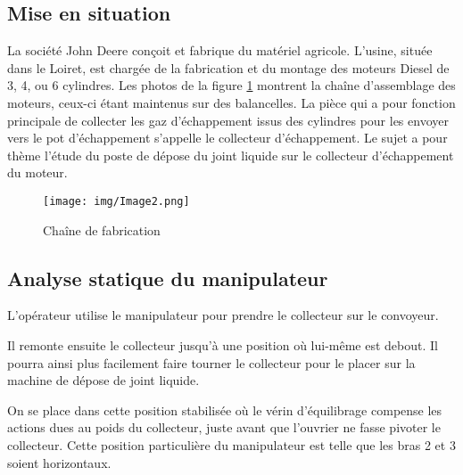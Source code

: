 \subsection{Mise en situation}

La société John Deere conçoit et fabrique du matériel agricole. L'usine, située dans le Loiret, est chargée de la fabrication et du montage des moteurs Diesel de 3, 4, ou 6 cylindres.
Les photos de la figure \ref{fig:image1} montrent la chaîne d'assemblage des moteurs, ceux-ci étant maintenus sur des balancelles.
La pièce qui a pour fonction principale de collecter les gaz d'échappement issus des cylindres pour les envoyer vers le pot d'échappement s'appelle le collecteur d'échappement.
Le sujet a pour thème l'étude du poste de dépose du joint liquide sur le collecteur d'échappement du moteur.

\begin{figure}[htbp]
\begin{center}
\texttt{[image: img/Image2.png]}
\caption{Chaîne de fabrication}
\label{fig:image1}
\end{center}
\end{figure}

\subsection{Analyse statique du manipulateur}

L'opérateur utilise le manipulateur pour prendre le collecteur sur le convoyeur.

Il remonte ensuite le collecteur jusqu'à une position où lui-même est debout. Il pourra ainsi plus facilement faire tourner le collecteur pour le placer sur la machine de dépose de joint liquide.

On se place dans cette position stabilisée où le vérin d'équilibrage compense les actions dues au poids du collecteur, juste avant que l'ouvrier ne fasse pivoter le collecteur. Cette position particulière du manipulateur est telle que les bras 2 et 3 soient horizontaux.

